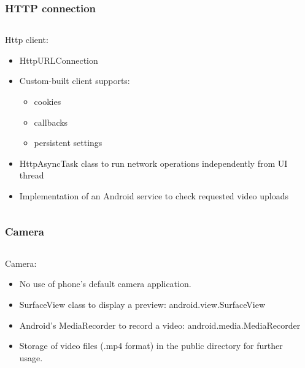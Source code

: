 \begin{frame}	
	\frametitle{HTTP connection}
	\begin{columns}[t]
		\begin{column}[t]{0.5\linewidth}
			Http client:
			\begin{itemize}
				\item HttpURLConnection
				\item Custom-built client supports:
				\begin{itemize}
					\item cookies
					\item callbacks
					\item persistent settings					
				\end{itemize} 
				\item HttpAsyncTask class to run network operations independently from UI thread
				\item Implementation of an Android service to check requested video uploads
			\end{itemize}
		\end{column}
		\begin{column}[t]{0.5\linewidth}
			
			
		\end{column}		
	\end{columns}	
\end{frame}

\begin{frame}	
	\frametitle{Camera}
	\begin{columns}[t]
		\begin{column}[t]{0.5\linewidth}
			Camera:
			\begin{itemize}
				\item No use of phone's default camera application.
				\item SurfaceView class to display a preview: android.view.SurfaceView
				\item Android's MediaRecorder to record a video: android.media.MediaRecorder
				\item Storage of video files (.mp4 format) in the public directory for further usage. 
			\end{itemize}
		\end{column}
		\begin{column}[t]{0.5\linewidth}
			
			
		\end{column}		
	\end{columns}	
\end{frame}

